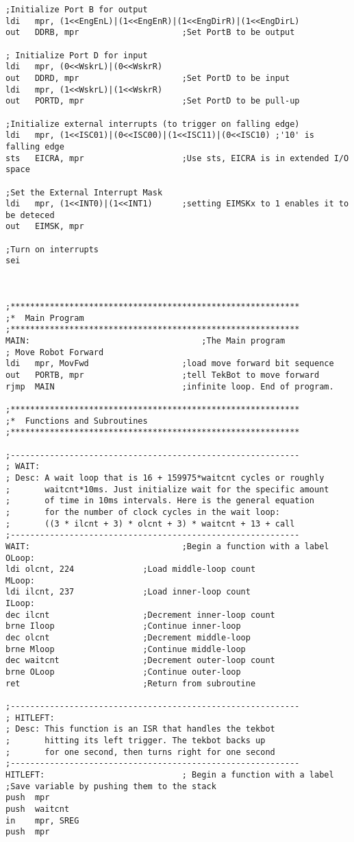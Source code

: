 \documentclass[12pt,letterpaper]{article}
\begin{document}
\begin{verbatim}
;Initialize Port B for output
ldi   mpr, (1<<EngEnL)|(1<<EngEnR)|(1<<EngDirR)|(1<<EngDirL)
out   DDRB, mpr         			;Set PortB to be output

; Initialize Port D for input
ldi   mpr, (0<<WskrL)|(0<<WskrR)
out   DDRD, mpr         			;Set PortD to be input
ldi   mpr, (1<<WskrL)|(1<<WskrR)
out   PORTD, mpr        			;Set PortD to be pull-up 

;Initialize external interrupts (to trigger on falling edge)
ldi   mpr, (1<<ISC01)|(0<<ISC00)|(1<<ISC11)|(0<<ISC10) ;'10' is falling edge
sts   EICRA, mpr        			;Use sts, EICRA is in extended I/O space

;Set the External Interrupt Mask
ldi   mpr, (1<<INT0)|(1<<INT1) 		;setting EIMSKx to 1 enables it to be deteced
out   EIMSK, mpr

;Turn on interrupts
sei



;***********************************************************
;*	Main Program
;***********************************************************
MAIN:									;The Main program
; Move Robot Forward
ldi   mpr, MovFwd					;load move forward bit sequence
out   PORTB, mpr					;tell TekBot to move forward
rjmp  MAIN							;infinite loop. End of program.

;***********************************************************
;*	Functions and Subroutines
;***********************************************************

;-----------------------------------------------------------
; WAIT: 
; Desc: A wait loop that is 16 + 159975*waitcnt cycles or roughly
; 		waitcnt*10ms. Just initialize wait for the specific amount
; 		of time in 10ms intervals. Here is the general equation
; 		for the number of clock cycles in the wait loop:
;		((3 * ilcnt + 3) * olcnt + 3) * waitcnt + 13 + call
;-----------------------------------------------------------
WAIT:								;Begin a function with a label
OLoop:
ldi olcnt, 224				;Load middle-loop count
MLoop:
ldi ilcnt, 237  			;Load inner-loop count
ILoop:
dec ilcnt  					;Decrement inner-loop count
brne Iloop 					;Continue inner-loop
dec olcnt 	 				;Decrement middle-loop
brne Mloop 					;Continue middle-loop
dec waitcnt 	 			;Decrement outer-loop count
brne OLoop 					;Continue outer-loop
ret 						;Return from subroutine

;-----------------------------------------------------------
; HITLEFT: 
; Desc: This function is an ISR that handles the tekbot
;		hitting its left trigger. The tekbot backs up
;		for one second, then turns right for one second
;-----------------------------------------------------------
HITLEFT:							; Begin a function with a label
;Save variable by pushing them to the stack
push  mpr
push  waitcnt
in    mpr, SREG
push  mpr


\end{verbatim}
\end{document}
